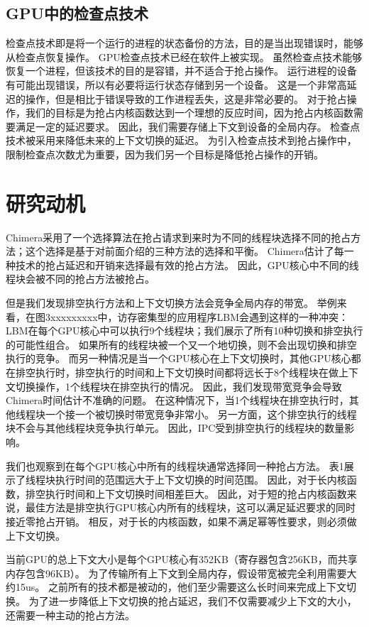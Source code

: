 \subsection{GPU中的检查点技术}
检查点技术即是将一个运行的进程的状态备份的方法，目的是当出现错误时，能够从检查点恢复操作。
GPU检查点技术已经在软件上被实现。
虽然检查点技术能够恢复一个进程，但该技术的目的是容错，并不适合于抢占操作。
运行进程的设备有可能出现错误，所以有必要将运行状态存储到另一个设备。
这是一个非常高延迟的操作，但是相比于错误导致的工作进程丢失，这是非常必要的。
对于抢占操作，我们的目标是为抢占内核函数达到一个理想的反应时间，因为抢占内核函数需要满足一定的延迟要求。
因此，我们需要存储上下文到设备的全局内存。
检查点技术被采用来降低未来的上下文切换的延迟。
为引入检查点技术到抢占操作中，限制检查点次数尤为重要，因为我们另一个目标是降低抢占操作的开销。


\section{研究动机}
Chimera采用了一个选择算法在抢占请求到来时为不同的线程块选择不同的抢占方法；这个选择是基于对前面介绍的三种方法的选择和平衡。
Chimera估计了每一种技术的抢占延迟和开销来选择最有效的抢占方法。
因此，GPU核心中不同的线程块会被不同的抢占方法被抢占。

但是我们发现排空执行方法和上下文切换方法会竞争全局内存的带宽。
举例来看，在图3xxxxxxxxx中，访存密集型的应用程序LBM会遇到这样的一种冲突：
LBM在每个GPU核心中可以执行9个线程块；我们展示了所有10种切换和排空执行的可能性组合。
如果所有的线程块被一个又一个地切换，则不会出现切换和排空执行的竞争。
而另一种情况是当一个GPU核心在上下文切换时，其他GPU核心都在排空执行时，排空执行的时间和上下文切换时间都将远长于8个线程块在做上下文切换操作，1个线程块在排空执行的情况。
因此，我们发现带宽竞争会导致Chimera时间估计不准确的问题。
在这种情况下，当1个线程块在排空执行时，其他线程块一个接一个被切换时带宽竞争非常小。
另一方面，这个排空执行的线程块不会与其他线程块竞争执行单元。
因此，IPC受到排空执行的线程块的数量影响。

我们也观察到在每个GPU核心中所有的线程块通常选择同一种抢占方法。
表1展示了线程块执行时间的范围远大于上下文切换的时间范围。
因此，对于长内核函数，排空执行时间和上下文切换时间相差巨大。
因此，对于短的抢占内核函数来说，最佳方法是排空执行GPU核心内所有的线程块，这可以满足延迟要求的同时接近零抢占开销。
相反，对于长的内核函数，如果不满足幂等性要求，则必须做上下文切换。

当前GPU的总上下文大小是每个GPU核心有352KB（寄存器包含256KB，而共享内存包含96KB）。
为了传输所有上下文到全局内存，假设带宽被完全利用需要大约15us。
之前所有的技术都是被动的，他们至少需要这么长时间来完成上下文切换。
为了进一步降低上下文切换的抢占延迟，我们不仅需要减少上下文的大小，还需要一种主动的抢占方法。

